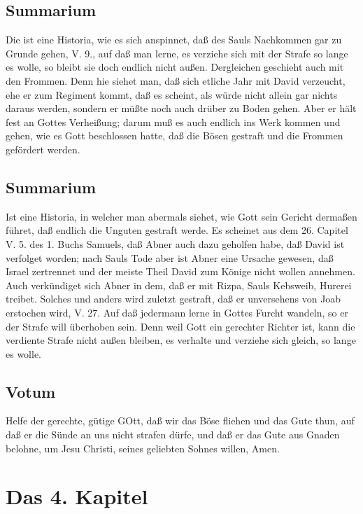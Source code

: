 \section{Summarium}

Die ist eine Historia, wie es sich anspinnet, daß des Sauls Nachkommen gar zu Grunde gehen, V. 9., auf daß man lerne, es verziehe sich mit der Strafe so lange es wolle, so bleibt sie doch endlich nicht außen. Dergleichen geschieht auch mit den Frommen. Denn hie siehet man, daß sich etliche Jahr mit David verzeucht, ehe er zum Regiment kommt, daß es scheint, als würde nicht allein gar nichts daraus werden,
sondern er müßte noch auch drüber zu Boden gehen. Aber er hält fest an Gottes Verheißung; darum muß es auch endlich ins Werk kommen und gehen, wie es Gott beschlossen hatte, daß die Bösen gestraft und die Frommen gefördert werden.

\section{Summarium}

Ist eine Historia, in welcher man abermals siehet, wie Gott sein Gericht dermaßen führet, daß endlich die Unguten gestraft werde. Es scheinet aus dem 26. Capitel V. 5. des 1. Buchs Samuels, daß Abner auch dazu geholfen habe, daß David ist verfolget worden; nach Sauls Tode aber ist Abner eine Ursache gewesen, daß Israel zertrennet und der meiste Theil David zum Könige nicht wollen annehmen. Auch verkündiget sich Abner in dem, daß er mit Rizpa, Sauls Kebsweib, Hurerei treibet. Solches und anders wird zuletzt gestraft, daß er unversehens von Joab erstochen wird, V. 27. Auf daß jedermann lerne in Gottes Furcht wandeln, so er der Strafe will überhoben sein. Denn weil Gott ein gerechter Richter ist, kann die verdiente Strafe nicht außen bleiben, es verhalte und verziehe sich gleich, so lange es wolle.

\section{Votum}

Helfe der gerechte, gütige GOtt, daß wir das Böse fliehen und das Gute thun, auf daß er die Sünde an uns nicht strafen dürfe, und daß er das Gute aus Gnaden belohne, um Jesu Christi, seines geliebten Sohnes willen, Amen.

\chapter{Das 4. Kapitel}

